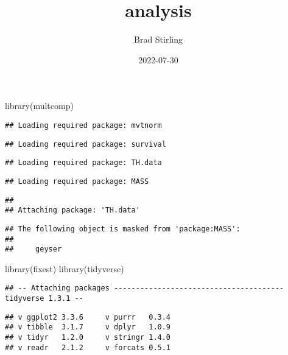\documentclass[
]{article}
\title{analysis}
\author{Brad Stirling}
\date{2022-07-30}
\newenvironment{Shaded}{\begin{snugshade}}{\end{snugshade}}
\newcommand{\FunctionTok}[1]{\textcolor[rgb]{0.00,0.00,0.00}{#1}}
\newcommand{\NormalTok}[1]{#1}
\begin{document}
\maketitle

\begin{Shaded}
\begin{Highlighting}[]
\FunctionTok{library}\NormalTok{(multcomp)}
\end{Highlighting}
\end{Shaded}

\begin{verbatim}
## Loading required package: mvtnorm
\end{verbatim}

\begin{verbatim}
## Loading required package: survival
\end{verbatim}

\begin{verbatim}
## Loading required package: TH.data
\end{verbatim}

\begin{verbatim}
## Loading required package: MASS
\end{verbatim}

\begin{verbatim}
## 
## Attaching package: 'TH.data'
\end{verbatim}

\begin{verbatim}
## The following object is masked from 'package:MASS':
## 
##     geyser
\end{verbatim}

\begin{Shaded}
\begin{Highlighting}[]
\FunctionTok{library}\NormalTok{(fixest)}
\FunctionTok{library}\NormalTok{(tidyverse)}
\end{Highlighting}
\end{Shaded}

\begin{verbatim}
## -- Attaching packages --------------------------------------- tidyverse 1.3.1 --
\end{verbatim}

\begin{verbatim}
## v ggplot2 3.3.6     v purrr   0.3.4
## v tibble  3.1.7     v dplyr   1.0.9
## v tidyr   1.2.0     v stringr 1.4.0
## v readr   2.1.2     v forcats 0.5.1
\end{verbatim}
\end{document}
